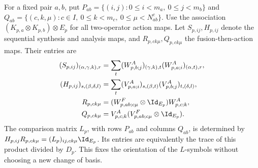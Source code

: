 For a fixed pair $a,b$, put
$P_{ab}=\{(i,j):0\leq i<m_a,\ 0\leq j<m_b\}$ and
$Q_{ab}=\{(c,k,\mu):c\in I,\ 0\leq k<m_c,\ 0\leq\mu<N_{ab}^c\}$.
Use the association $(K_{p,a}\otimes K_{p,b})\otimes E_p$ for
all two-operator action maps. Let $S_{p,ij},H_{p,ij}$ denote the
sequential synthesis and analysis maps, and $R_{p,ck\mu},Q_{p,ck\mu}$
the fusion-then-action maps. Their entries are
\begin{align}
    (S_{p,ij})_{(\alpha,\gamma,k),r}
                & =\sum_t(W^A_{p,b;j})_{(\gamma,k),t}
    (W^A_{p,a;i})_{(\alpha,t),r},
    \label{eq:mpo_mix_fusion_seq}                                      \\
    (H_{p,ij})_{s,(\beta,\delta,l)}
                & =\sum_t(V^A_{p,a;i})_{s,(\beta,t)}
    (V^A_{p,b;j})_{t,(\delta,l)},\notag                                \\
    R_{p,ck\mu} & =(W^F_{p,ab;c\mu}\otimes\Id_{E_p})W^A_{p,c;k},
    \label{eq:mpo_mix_fusion_tree}                                     \\
    Q_{p,ck\mu} & =V^A_{p,c;k}(V^F_{p,ab;c\mu}\otimes\Id_{E_p}).\notag
\end{align}
The comparison matrix $L_p$, with rows $P_{ab}$ and columns
$Q_{ab}$, is determined by
$H_{p,ij}R_{p,ck\mu}=(L_p)_{ij,ck\mu}\Id_{E_p}$.
Its entries are equivalently the trace of this product divided by $D_p$.
This fixes the orientation of the $L$-symbols without choosing a new
change of basis.

